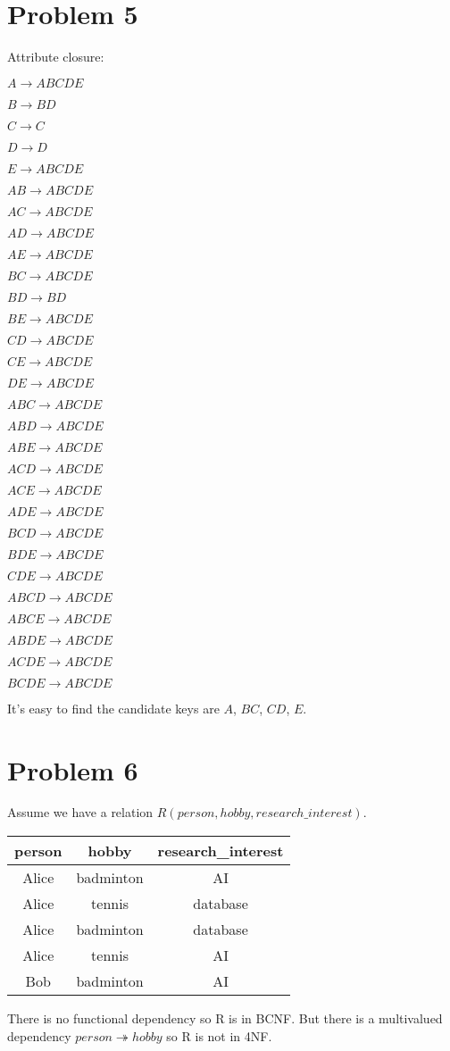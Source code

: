 \documentclass[a4paper,11pt]{article}
\begin{document}
\section*{Problem 5}
Attribute closure:\par
$A \rightarrow ABCDE$\par
$B \rightarrow BD$\par
$C \rightarrow C$\par
$D \rightarrow D$\par
$E \rightarrow ABCDE$\par
$AB \rightarrow ABCDE$\par
$AC \rightarrow ABCDE$\par
$AD \rightarrow ABCDE$\par
$AE \rightarrow ABCDE$\par
$BC \rightarrow ABCDE$\par
$BD \rightarrow BD$\par
$BE \rightarrow ABCDE$\par
$CD \rightarrow ABCDE$\par
$CE \rightarrow ABCDE$\par
$DE \rightarrow ABCDE$\par
$ABC \rightarrow ABCDE$\par
$ABD \rightarrow ABCDE$\par
$ABE \rightarrow ABCDE$\par
$ACD \rightarrow ABCDE$\par
$ACE \rightarrow ABCDE$\par
$ADE \rightarrow ABCDE$\par
$BCD \rightarrow ABCDE$\par
$BDE \rightarrow ABCDE$\par
$CDE \rightarrow ABCDE$\par
$ABCD \rightarrow ABCDE$\par
$ABCE \rightarrow ABCDE$\par
$ABDE \rightarrow ABCDE$\par
$ACDE \rightarrow ABCDE$\par
$BCDE \rightarrow ABCDE$\par
It's easy to find the candidate keys are $A$, $BC$, $CD$, $E$.

\section*{Problem 6}
Assume we have a relation $R(person, hobby, research\_interest)$.\par
\begin{tabular}{c|c|c}
\hline 
person & hobby & research\_interest \\ 
\hline 
Alice & badminton & AI \\ 
Alice & tennis & database\\
Alice & badminton & database\\
Alice & tennis & AI\\
Bob & badminton & AI\\
\hline 
\end{tabular} 

There is no functional dependency so R is in BCNF. But there is a multivalued dependency $person \twoheadrightarrow hobby$ so R is not in 4NF.
\end{document}
